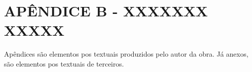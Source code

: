 \section*{\centering APÊNDICE B - XXXXXXX XXXXX}

\justifying
Apêndices são elementos pos textuais produzidos pelo autor da obra. Já anexos, são elementos pos textuais de terceiros. 